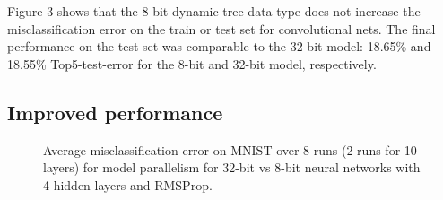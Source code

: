\documentclass{article} %
\begin{document}
Figure 3 shows that the 8-bit dynamic tree data type does not increase the misclassification error on the train or test set for convolutional nets. The final performance on the test set was comparable to the 32-bit model: 18.65\% and 18.55\% Top5-test-error for the 8-bit and 32-bit model, respectively.

\subsection{Improved performance}
\begin{figure}[h]
	\begin{center}
	\end{center}
	\caption{Average misclassification error on MNIST over 8 runs (2 runs for 10 layers) for model parallelism for 32-bit vs 8-bit neural networks with 4 hidden layers and RMSProp.}
\end{figure}
\end{document}
